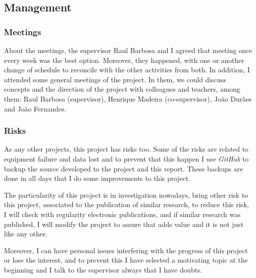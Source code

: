 \subsection{Management}

\subsubsection{Meetings}

About the meetings, the supervisor Raul Barbosa and I agreed that meeting once every week was the best option. Moreover, they happened, with one or another change of schedule to reconcile with the other activities from both. In addition, I attended some general meetings of the project. In them, we could discuss concepts and the direction of the project with colleagues and teachers, among them: Raul Barbosa (supervisor), Henrique Madeira (co-supervisor), João Durães and João Fernandes.

\subsubsection{Risks}

As any other projects, this project has risks too.
Some of the risks are related to equipment failure and data lost and to prevent that this happen I use \textit{GitHub} to backup the source developed to the project and this report. These backups are done in all days that I do some improvements to this project.

The particularity of this project is in investigation nowadays, bring other risk to this project, associated to the publication of similar research, to reduce this risk, I will check with regularity electronic publications, and if similar research was published, I will modify the project to assure that adds value and it is not just like any other.

Moreover, I can have personal issues interfering with the progress of this project or lose the interest, and to prevent this I have selected a motivating topic at the beginning and I talk to the supervisor always that I have doubts.

